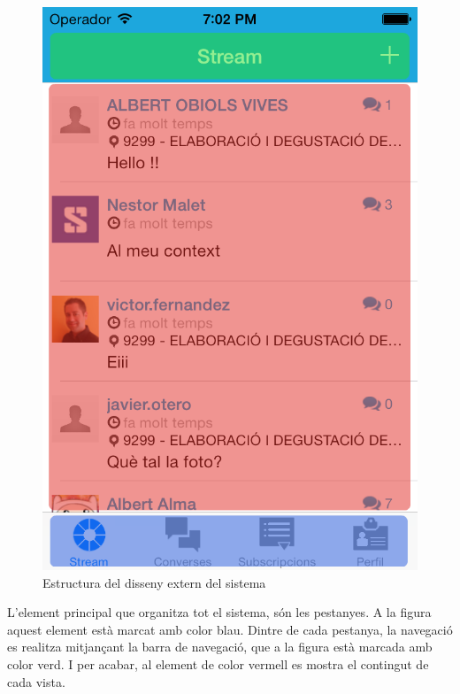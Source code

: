 \begin{figure}[ht]
    \centering
    \includegraphics[scale=0.25]{Memoria/Arquitectura/Projecte/Presentacio/disseny_extern.png}
    \caption{Estructura del disseny extern del sistema}
    \label{fig:disseny_extern}
\end{figure}

L'element principal que organitza tot el sistema, són les pestanyes. A la figura aquest element està marcat amb color blau. Dintre de cada pestanya, la navegació es realitza mitjançant la barra de navegació, que a la figura està marcada amb color verd. I per acabar, al element de color vermell es mostra el contingut de cada vista.

\FloatBarrier
